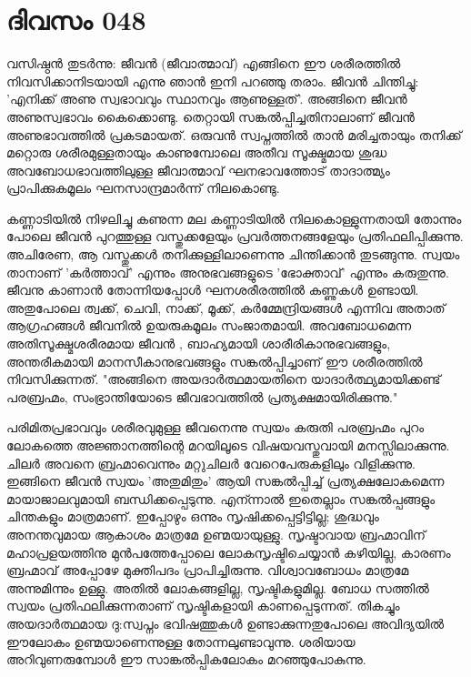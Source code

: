 \newpage
\section{ദിവസം 048}


വസിഷ്ഠന്‍ തുടര്‍ന്നു: ജീവന്‍ (ജീവാത്മാവ്‌) എങ്ങിനെ ഈ ശരീരത്തില്‍ നിവസിക്കാനിടയായി എന്നു ഞാന്‍ ഇനി പറഞ്ഞു തരാം. ജീവന്‍ ചിന്തിച്ചു: 'എനിക്ക്‌ അണു സ്വഭാവവും സ്ഥാനവും ആണുള്ളത്‌'. അങ്ങിനെ ജീവന്‍ അണുസ്വഭാവം കൈക്കൊണ്ടു. തെറ്റായി സങ്കല്‍പ്പിച്ചതിനാലാണ്‌ ജീവന്‍ അണുഭാവത്തില്‍ പ്രകടമായത്‌. ഒരുവന്‍ സ്വപ്നത്തില്‍ താന്‍ മരിച്ചതായും തനിക്ക്‌ മറ്റൊരു ശരീരമുള്ളതായും കാണുമ്പോലെ അതീവ സൂക്ഷ്മമായ ശുദ്ധ അവബോധഭാവത്തിലുള്ള ജീവാത്മാവ്‌ ഘനഭാവത്തോട്‌ താദാത്മ്യം പ്രാപിക്കുകമൂലം ഘനസാന്ദ്രമാര്‍ന്ന് നിലകൊണ്ടു.

കണ്ണാടിയില്‍ നിഴലിച്ചു കണുന്ന മല കണ്ണാടിയില്‍ നിലകൊള്ളുന്നതായി തോന്നും പോലെ ജീവന്‍ പുറത്തുള്ള വസ്തുക്കളേയും പ്രവര്‍ത്തനങ്ങളേയും പ്രതിഫലിപ്പിക്കുന്നു. അചിരേണ, ആ വസ്തുക്കള്‍ തനിക്കുള്ളിലാണെന്നു ചിന്തിക്കാന്‍ തുടങ്ങുന്നു. സ്വയം താനാണ്‌ 'കര്‍ത്താവ്‌' എന്നും അനുഭവങ്ങളുടെ 'ഭോക്താവ്‌' എന്നും കരുതുന്നു. ജീവനു കാണാന്‍ തോന്നിയപ്പോള്‍ ഘനശരീരത്തില്‍ കണ്ണുകള്‍ ഉണ്ടായി. അതുപോലെ ത്വക്ക്‌, ചെവി, നാക്ക്‌, മൂക്ക്‌, കര്‍മ്മേന്ദ്രിയങ്ങള്‍ എന്നിവ അതാത്‌ ആഗ്രഹങ്ങള്‍ ജീവനില്‍ ഉയരുകമൂലം സംജാതമായി. അവബോധമെന്ന അതിസൂക്ഷ്മശരീരമായ ജീവന്‍ , ബാഹ്യമായി ശാരീരികാനുഭവങ്ങളും, അന്തരീകമായി മാനസീകാനുഭവങ്ങളും സങ്കല്‍പ്പിച്ചാണ്‌ ഈ ശരീരത്തില്‍ നിവസിക്കുന്നത്‌. "അങ്ങിനെ അയദാര്‍ത്ഥമായതിനെ യാദാര്‍ത്ഥ്യമായിക്കണ്ട്‌ പരബ്രഹ്മം, സംഭ്രാന്തിയോടെ ജീവഭാവത്തില്‍ പ്രത്യക്ഷമായിരിക്കുന്നു."

പരിമിതപ്രഭാവവും ശരീരവുമുള്ള ജീവനെന്നു സ്വയം കരുതി പരബ്രഹ്മം പുറം ലോകത്തെ അജ്ഞാനത്തിന്റെ മറയിലൂടെ വിഷയവസ്തുവായി മനസ്സിലാക്കുന്നു. ചിലര്‍ അവനെ ബ്രഹ്മാവെന്നും മറ്റുചിലര്‍ വേറെപേരുകളിലും വിളിക്കുന്നു. ഇങ്ങിനെ ജീവന്‍ സ്വയം 'അതുമിതും' ആയി സങ്കല്‍പ്പിച്ച്‌ പ്രത്യക്ഷലോകമെന്ന മായാജാലവുമായി ബന്ധിക്കപ്പെടുന്നു. എന്ന്നാല്‍ ഇതെല്ലാം സങ്കല്‍പ്പങ്ങളും ചിന്തകളും മാത്രമാണ്‌. ഇപ്പോഴും ഒന്നും സൃഷിക്കപ്പെട്ടിട്ടില്ല; ശുദ്ധവും അനന്തവുമായ ആകാശം മാത്രമേ ഉണ്മയായുള്ളു. സൃഷ്ടാവായ ബ്രഹ്മാവിന്‌ മഹാപ്രളയത്തിനു മുന്‍പത്തേപ്പോലെ ലോകസൃഷ്ടിചെയ്യാന്‍ കഴിയില്ല, കാരണം ബ്രഹ്മാവ്‌ അപ്പോഴേ മുക്തിപദം പ്രാപിച്ചിരുന്നു. വിശ്വാവബോധം മാത്രമേ അന്നുമിന്നും ഉള്ളു. അതില്‍ ലോകങ്ങളില്ല, സൃഷ്ടികളുമില്ല. ബോധ സത്തിൽ സ്വയം പ്രതിഫലിക്കുന്നതാണ്‌ സൃഷ്ടികളായി കാണപ്പെടുന്നത്‌. തികച്ചും അയദാര്‍ത്ഥമായ ദു:സ്വപ്നം ഭവിഷത്തുകള്‍ ഉണ്ടാക്കുന്നതുപോലെ അവിദ്യയില്‍ ഈലോകം ഉണ്മയാണെന്നുള്ള തോന്നലുണ്ടാവുന്നു. ശരിയായ അറിവുണരുമ്പോള്‍ ഈ സാങ്കല്‍പ്പികലോകം മറഞ്ഞുപോകുന്നു. 
